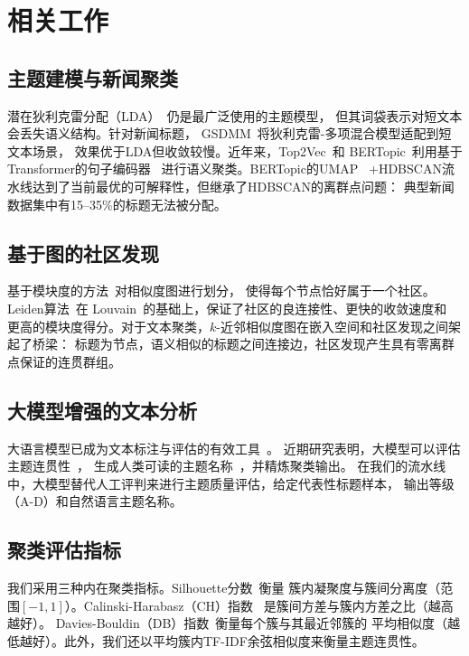 \documentclass[10pt,twocolumn,twoside]{ctexart}
\begin{document}
\section{相关工作}

\subsection{主题建模与新闻聚类}
潜在狄利克雷分配（LDA）~\citep{blei2003latent}仍是最广泛使用的主题模型，
但其词袋表示对短文本会丢失语义结构。针对新闻标题，
GSDMM~\citep{yin2014gsdmm}将狄利克雷-多项混合模型适配到短文本场景，
效果优于LDA但收敛较慢。近年来，Top2Vec~\citep{angelov2020}和
BERTopic~\citep{grootendorst2022bertopic}利用基于Transformer的句子编码器
~\citep{reimers2019sentence}进行语义聚类。BERTopic的UMAP~\citep{mcinnes2018umap}
+HDBSCAN流水线达到了当前最优的可解释性，但继承了HDBSCAN的离群点问题：
典型新闻数据集中有15--35\%的标题无法被分配。

\subsection{基于图的社区发现}
基于模块度的方法~\citep{newman2006modularity, newman2004finding}对相似度图进行划分，
使得每个节点恰好属于一个社区。Leiden算法~\citep{traag2019leiden}在
Louvain~\citep{blondel2008fast}的基础上，保证了社区的良连接性、更快的收敛速度和
更高的模块度得分。对于文本聚类，$k$-近邻相似度图在嵌入空间和社区发现之间架起了桥梁：
标题为节点，语义相似的标题之间连接边，社区发现产生具有零离群点保证的连贯群组。

\subsection{大模型增强的文本分析}
大语言模型已成为文本标注与评估的有效工具~\citep{wang2023llm, chang2023llm}。
近期研究表明，大模型可以评估主题连贯性~\citep{viswanathan2023llm}，
生成人类可读的主题名称~\citep{zhang2024llm}，并精炼聚类输出。
在我们的流水线中，大模型替代人工评判来进行主题质量评估，给定代表性标题样本，
输出等级（A-D）和自然语言主题名称。

\subsection{聚类评估指标}
我们采用三种内在聚类指标。Silhouette分数~\citep{rousseeuw1987silhouettes}衡量
簇内凝聚度与簇间分离度（范围$[-1,1]$）。Calinski-Harabasz（CH）指数
~\citep{calinski1974dendrite}是簇间方差与簇内方差之比（越高越好）。
Davies-Bouldin（DB）指数~\citep{davies1979cluster}衡量每个簇与其最近邻簇的
平均相似度（越低越好）。此外，我们还以平均簇内TF-IDF余弦相似度来衡量主题连贯性。
\end{document}
